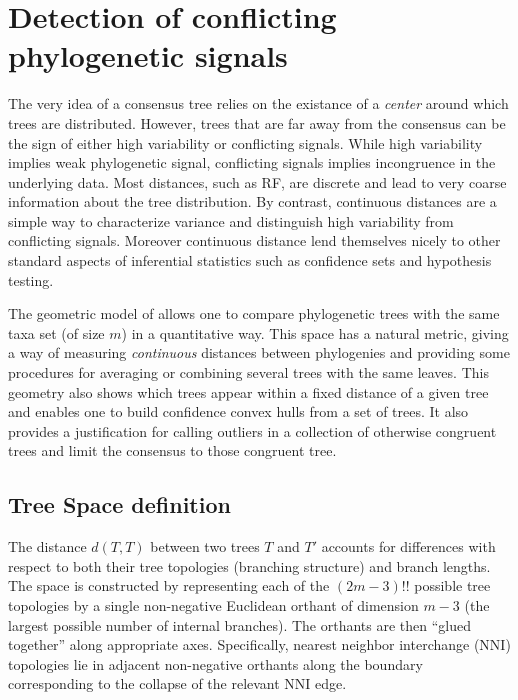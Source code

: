 \section{Detection of conflicting phylogenetic signals} \label{sec:extensions}

The very idea of a consensus tree relies on the existance of a \emph{center} around which trees are distributed. However, trees that are far away from the consensus can be the sign of either high variability or conflicting signals. While high variability implies weak phylogenetic signal, conflicting  signals implies incongruence in the underlying data. Most distances, such as RF, are discrete and lead to very coarse information about the tree distribution. By contrast, continuous distances are a simple way to characterize variance and distinguish high variability from conflicting signals. Moreover continuous distance lend themselves nicely to other standard aspects of inferential statistics such as confidence sets and hypothesis testing.


The  geometric  model of \citet{Billera2001} allows one to compare phylogenetic trees with the same taxa set (of size $m$) in a quantitative way. This  space  has  a  natural  metric, giving a way of measuring \emph{continuous} distances between phylogenies and providing some procedures for averaging or combining several trees with the same leaves. This geometry also shows which trees appear within a fixed distance of a given tree and enables one to build confidence convex hulls from a set of trees. It also provides a justification for calling outliers in a collection of otherwise congruent trees and limit the consensus to those congruent tree.

\subsection{Tree Space definition} \label{sec:Tree-distances}
 The distance $d(T,T)$ between two trees $T$ and $T'$ accounts for differences with respect to both their tree topologies (branching structure) and branch lengths. The space is constructed by representing each of the $(2m-3)!!$ possible tree topologies by a single non-negative Euclidean orthant of dimension $m-3$ (the largest possible number of internal branches). The orthants are then “glued together” along appropriate axes. Specifically, nearest neighbor interchange (NNI) topologies lie in adjacent non-negative orthants along the boundary corresponding to the collapse of the relevant NNI edge.

